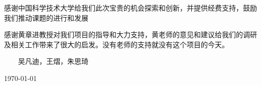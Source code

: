 
\begin{thanks}

感谢中国科学技术大学给我们此次宝贵的机会探索和创新，并提供经费支持，鼓励我们推动课题的进行和发展

感谢黄章进教授对我们项目的指导和大力支持，黄老师的意见和建议给我们的调研及相关工作带来了很大的启发。没有老师的支持就没有这个项目的今天。

\begin{flushright}

~~~~吴凡迪，王熠，朱思琦~~~~

\today

\end{flushright}

\end{thanks}
